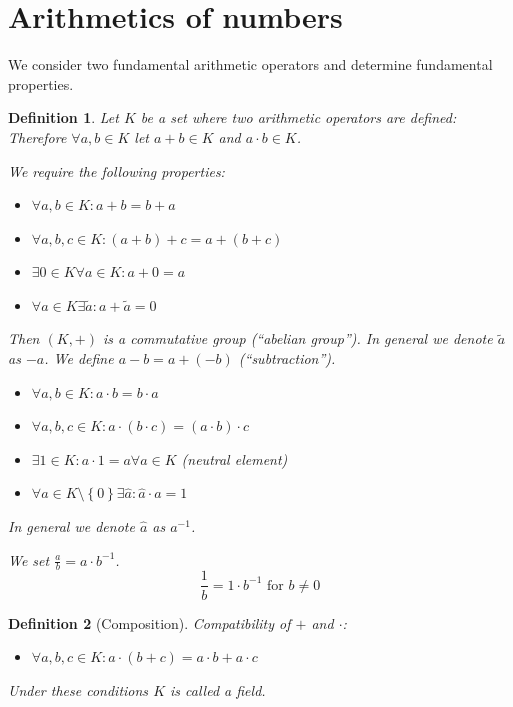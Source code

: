 \documentclass[a4paper,landscape,twocolumn]{article}
\newtheorem{defi}{Definition}
\newcommand\set[1]{\left\{#1\right\}}
\begin{document}
\section{Arithmetics of numbers}
%
We consider two fundamental arithmetic operators and determine fundamental properties.

\begin{defi}
  Let $K$ be a set where two arithmetic operators are defined:
  Therefore $\forall a,b \in K$ let $a + b \in K$ and $a \cdot b \in K$.

  We require the following properties:
  \begin{itemize}
    \item[\textbf{A1}] $\forall a,b \in K: a + b = b + a$
    \item[\textbf{A2}] $\forall a,b,c \in K: (a + b) + c = a + (b + c)$
    \item[\textbf{A3}] $\exists 0 \in K \forall a \in K: a + 0 = a$
    \item[\textbf{A4}] $\forall a \in K \exists \tilde{a}: a + \tilde{a} = 0$
  \end{itemize}
  Then $(K, +)$ is a commutative group (\enquote{abelian group}).
  In general we denote $\tilde{a}$ as $-a$.
  We define $a - b = a + (-b)$ (\enquote{subtraction}).

  \begin{itemize}
    \item[\textbf{M1}] $\forall a,b \in K: a \cdot b = b \cdot a$
    \item[\textbf{M2}] $\forall a,b,c \in K: a \cdot (b \cdot c) = (a \cdot b) \cdot c$
    \item[\textbf{M3}] $\exists 1 \in K: a \cdot 1 = a \forall a \in K$ (neutral element)
    \item[\textbf{M4}] $\forall a \in K \setminus \set{0} \exists \hat a: \hat a \cdot a = 1$
  \end{itemize}
  In general we denote $\hat a$ as $a^{-1}$.

  We set $\frac ab = a \cdot b^{-1}$.
  \[ \frac{1}{b} = 1 \cdot b^{-1} \text{ for } b \neq 0 \]
\end{defi}

\begin{defi}[Composition]
  Compatibility of $+$ and $\cdot$:
  \begin{itemize}
    \item[\textbf{D}] $\forall a,b,c \in K: a \cdot (b + c) = a \cdot b + a \cdot c$
  \end{itemize}
  Under these conditions $K$ is called a \emph{field}.
\end{defi}
\end{document}
